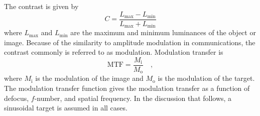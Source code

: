 \documentclass[11pt, oneside]{scrartcl}   	%
\begin{document}
The contrast is given by
\begin{equation}
C = \frac{L_\mathrm{max} - L_\mathrm{min}}{L_\mathrm{max} + L_\mathrm{min}}
\end{equation}
where $L_\mathrm{max}$ and $ L_\mathrm{min}$ are the maximum and minimum luminances of the object or image. Because of the similarity to amplitude modulation in communications, the contrast commonly is referred to as modulation. Modulation transfer is
\begin{equation}
\mathrm{MTF} = \frac{M_\mathrm i}{M_\mathrm o}\quad,
\end{equation}
where $M_\mathrm i$ is the modulation of the image and $M_\mathrm o$ is the modulation of the target. The modulation transfer function gives the modulation transfer as a function of defocus, $f$-number, and spatial frequency. In the discussion that follows, a sinusoidal target is assumed in all cases.
\end{document}
